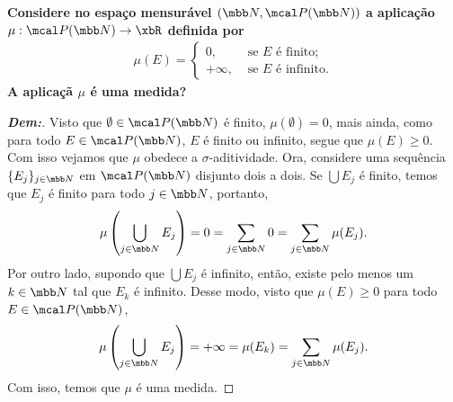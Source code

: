\biglinend
\newpage 
{}
\bigline
\textbf{Considere no espaço 
mensurável $(\mbb N, \mcal P(\mbb N))$ a aplicação $\mu: \mcal 
P(\mbb N) \rightarrow \xbR$
definida por 
\begin{align*}
  \mu(E) = \begin{cases}
    0, &\text{ se $E$ é finito;}\\
    +\infty, &\text{ se $E$ é infinito.}
  \end{cases}
\end{align*}
A aplicaçã $\mu$ é uma medida?
}
\begin{proof}[\textbf{Dem:}]
  Visto que $\emptyset \in \mcal P(\mbb N)$ é finito, 
  $\mu(\emptyset) = 0$, mais ainda, como para todo 
  $E \in \mcal P (\mbb N)$, $E$ é finito ou infinito, segue que $\mu(E) \ge 0$. Com isso
  vejamos que $\mu$ obedece a $\sigma$-aditividade. Ora, considere uma sequência  
  $\{E_j\}_{j \in \mbb N}$ em $\mcal P(\mbb N)$ disjunto dois a dois. Se $\bigcup E_j$
  é finito, temos que $E_j$ é finito para todo $j \in \mbb N$, portanto, 
  \begin{align*}
    \mu\left(\bigcup_{j \in \mbb N} E_j\right) = 0 = \sum_{j \in \mbb N} 0
    = \sum_{j \in \mbb N} \mu(E_j). 
  \end{align*}
  Por outro lado, supondo que $\bigcup E_j$ é infinito, então, existe pelo 
  menos um $k \in \mbb N$ tal que $E_k$ é infinito. Desse modo, 
  visto que $\mu(E) \ge 0$ para todo $E \in \mcal P(\mbb N)$,
  \begin{align*}
    \mu\left(\bigcup_{j \in \mbb N} E_j\right) = +\infty = \mu(E_k)
    = \sum_{j \in \mbb N} \mu(E_j).
  \end{align*}
  Com isso, temos que $\mu$ é uma medida.
\end{proof}

